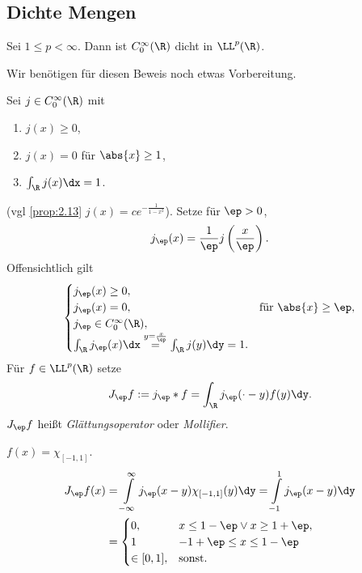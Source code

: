 \subsection{Dichte Mengen}

\begin{prop}
\label{prop:2.19}
Sei $1\le p <\infty$. Dann ist $C_0^\infty(\R)$ dicht in $\LL^p(\R)$.\fishhere
\end{prop}

Wir benötigen für diesen Beweis noch etwas Vorbereitung.

\begin{defn}
\label{defn:2.20}

Sei $j\in C_0^\infty(\R)$ mit
\begin{enumerate}[label=\arabic{*}.)]
  \item $j(x) \ge 0$,
  \item $j(x) = 0$ für $\abs{x}\ge 1$,
  \item $\int_\R j(x)\dx = 1$.
\end{enumerate}
(vgl \ref{prop:2.13} $j(x) = ce^{-\frac{1}{1-x^2}}$). Setze für $\ep>0$,
\begin{align*}
j_\ep(x) = \frac{1}{\ep}j\left(\frac{x}{\ep} \right).
\end{align*}
Offensichtlich gilt
\begin{align*}
\begin{cases}
j_\ep(x)\ge 0,\\
j_\ep(x) = 0,& \text{für }\abs{x}\ge\ep,\\
j_\ep\in C_0^\infty(\R),\\
\int_\R j_\ep(x)\dx \overset{y=\frac{x}{\ep}}{=} \int_\R j(y)\dy = 1.
\end{cases}
\end{align*}
Für $f\in\LL^p(\R)$ setze
\begin{align*}
J_\ep f := j_\ep * f = \int_\R j_\ep(\cdot -y)f(y)\dy.
\end{align*}
$J_\ep f$ heißt \emph{Glättungsoperator} oder \emph{Mollifier}.\fishhere
\end{defn}

\begin{bsp}
\label{bsp:2.21}
$f(x) = \chi_{[-1,1]}$.
\begin{align*}
J_\ep f(x) &= 
\int\limits_{-\infty}^\infty j_\ep(x-y)\chi_{[-1,1]}(y)\dy
= \int\limits_{-1}^1 j_\ep(x-y)\dy\\
&= \begin{cases}
  0, & x\le 1-\ep\lor x\ge 1+\ep,\\
  1 & -1+\ep\le x \le 1-\ep\\
  \in[0,1], & \text{sonst}.
  \end{cases}
\end{align*}
\end{bsp}

